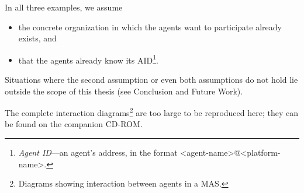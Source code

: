In all three examples, we assume
\begin{itemize}
	\item the concrete organization in which the agents want to participate already exists, and
	\item that the agents already know its AID\footnote{\textit{Agent ID}---an agent's address, in the format \textless{}agent-name\textgreater{}@\textless{}platform-name\textgreater{}.}.
\end{itemize}
Situations where the second assumption or even both assumptions do not hold lie outside the scope of this thesis (see Conclusion and Future Work).

The complete interaction diagrams\footnote{Diagrams showing interaction between agents in a MAS.} are too large to be reproduced here; they can be found on the companion CD-ROM. 





